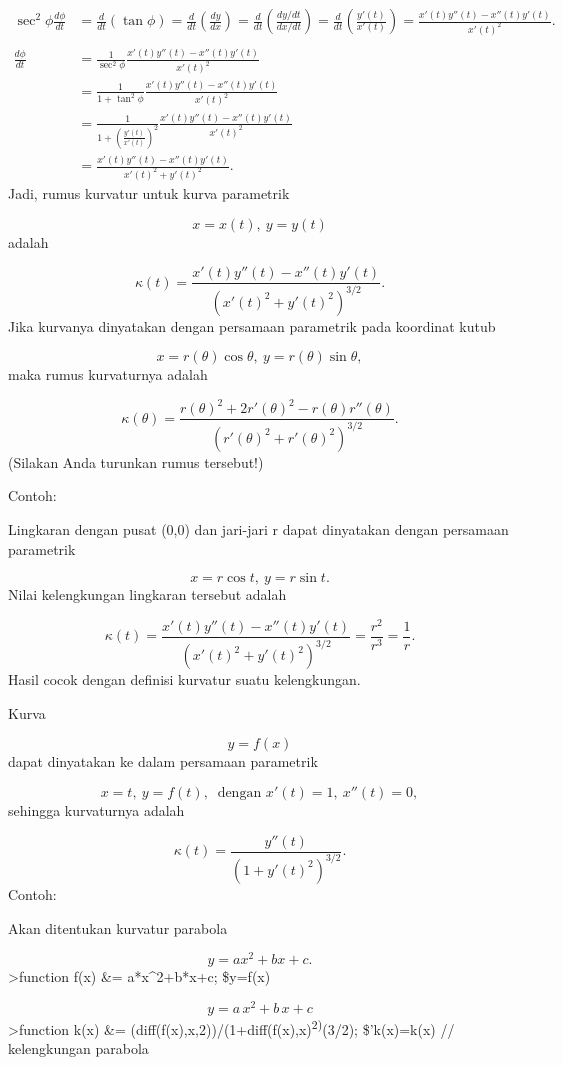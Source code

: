 \documentclass[
]{book}
\begin{document}
\[\begin{aligned}\sec^2\phi\frac{d\phi}{dt} &= \frac{d}{dt}\left(\tan\phi\right)= \frac{d}{dt}\left(\frac{dy}{dx}\right)= \frac{d}{dt}\left(\frac{dy/dt}{dx/dt}\right)= \frac{d}{dt}\left(\frac{y'(t)}{x'(t)}\right)=\frac{x'(t)y''(t)-x''(t)y'(t)}{x'(t)^2}.\\ & \\ \frac{d\phi}{dt} &= \frac{1}{\sec^2\phi}\frac{x'(t)y''(t)-x''(t)y'(t)}{x'(t)^2}\\ &= \frac{1}{1+\tan^2\phi}\frac{x'(t)y''(t)-x''(t)y'(t)}{x'(t)^2}\\ &= \frac{1}{1+\left(\frac{y'(t)}{x'(t)}\right)^2}\frac{x'(t)y''(t)-x''(t)y'(t)}{x'(t)^2}\\ &= \frac{x'(t)y''(t)-x''(t)y'(t)}{x'(t)^2+y'(t)^2}.\end{aligned}\]Jadi, rumus kurvatur untuk kurva parametrik

\[x=x(t),\ y=y(t)\]adalah

\[\kappa(t) = \frac{x'(t)y''(t)-x''(t)y'(t)}{\left(x'(t)^2+y'(t)^2\right)^{3/2}}.\]Jika kurvanya dinyatakan dengan persamaan parametrik pada koordinat kutub

\[x=r(\theta)\cos\theta,\ y=r(\theta)\sin\theta,\]maka rumus kurvaturnya adalah

\[\kappa(\theta) = \frac{r(\theta)^2+2r'(\theta)^2-r(\theta)r''(\theta)}{\left(r'(\theta)^2+r'(\theta)^2\right)^{3/2}}.\](Silakan Anda turunkan rumus tersebut!)

Contoh:

Lingkaran dengan pusat (0,0) dan jari-jari r dapat dinyatakan dengan persamaan parametrik

\[x=r\cos t,\ y=r\sin t.\]Nilai kelengkungan lingkaran tersebut adalah

\[\kappa(t)=\frac{x'(t)y''(t)-x''(t)y'(t)}{\left(x'(t)^2+y'(t)^2\right)^{3/2}}=\frac{r^2}{r^3}=\frac 1 r.\]Hasil cocok dengan definisi kurvatur suatu kelengkungan.

Kurva

\[y=f(x)\]dapat dinyatakan ke dalam persamaan parametrik

\[x=t,\ y=f(t),\ \text{ dengan } x'(t)=1,\ x''(t)=0,\]sehingga kurvaturnya adalah

\[\kappa(t) = \frac{y''(t)}{\left(1+y'(t)^2\right)^{3/2}}.\]Contoh:

Akan ditentukan kurvatur parabola

\[y=ax^2+bx+c.\]\textgreater function f(x) \&= a*x\^{}2+b*x+c; \$y=f(x)

\[y=a\,x^2+b\,x+c\]\textgreater function k(x) \&= (diff(f(x),x,2))/(1+diff(f(x),x)\textsuperscript{2)}(3/2); \$'k(x)=k(x) // kelengkungan parabola
\end{document}
